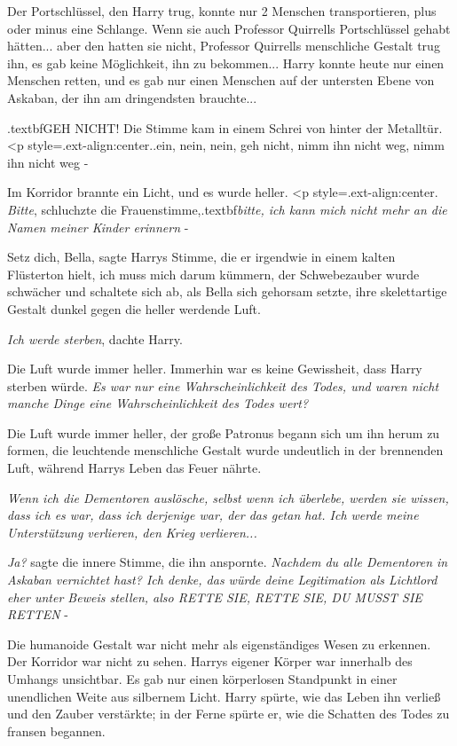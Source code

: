 Der Portschlüssel, den Harry trug, konnte nur 2 Menschen transportieren, plus
oder minus eine Schlange. Wenn sie auch Professor Quirrells Portschlüssel gehabt
hätten... aber den hatten sie nicht, Professor Quirrells menschliche Gestalt
trug ihn, es gab keine Möglichkeit, ihn zu bekommen... Harry konnte heute nur
einen Menschen retten, und es gab nur einen Menschen auf der untersten Ebene von
Askaban, der ihn am dringendsten brauchte...

\grqq{}.textbf{GEH NICHT!}\grqq{} Die
Stimme kam in einem Schrei von hinter der Metalltür.   <p
style=\grqq{}.ext-align:center\grqq{}.\grqq{}.ein, nein, nein, geh nicht, nimm
ihn nicht weg, nimm ihn nicht weg -\grqq{}

Im Korridor brannte ein Licht, und es wurde heller. <p
style=\grqq{}.ext-align:center\grqq{}. \glqq{}\emph{Bitte}\grqq{}, schluchzte die
Frauenstimme,\grqq{}.textbf{\emph{bitte, ich kann mich nicht mehr an die Namen
meiner Kinder erinnern} }-\grqq{}

\glqq{}Setz dich, Bella\grqq{}, sagte Harrys Stimme, die er irgendwie in einem
kalten Flüsterton hielt, \glqq{}ich muss mich darum kümmern\grqq{}, der
Schwebezauber wurde schwächer und schaltete sich ab, als Bella sich gehorsam
setzte, ihre skelettartige Gestalt dunkel gegen die heller werdende Luft.

\emph{Ich werde sterben}, dachte Harry.

Die Luft wurde immer heller. Immerhin war es keine Gewissheit, dass Harry
sterben würde. \emph{Es war nur eine Wahrscheinlichkeit des Todes, und waren
nicht manche Dinge eine Wahrscheinlichkeit des Todes wert?}

Die Luft wurde immer heller, der große Patronus begann sich um ihn herum zu
formen, die leuchtende menschliche Gestalt wurde undeutlich in der brennenden
Luft, während Harrys Leben das Feuer nährte.

\emph{Wenn ich die Dementoren auslösche, selbst wenn ich überlebe, werden sie
wissen, dass ich es war, dass ich derjenige war, der das getan hat. Ich werde
meine Unterstützung verlieren, den Krieg verlieren...}

\emph{Ja?} sagte die innere Stimme, die ihn anspornte. \emph{Nachdem du alle
Dementoren in Askaban vernichtet hast? Ich denke, das würde deine Legitimation
als Lichtlord eher unter Beweis stellen, also RETTE SIE, RETTE SIE, DU MUSST SIE
RETTEN} -

Die humanoide Gestalt war nicht mehr als eigenständiges Wesen zu erkennen. Der
Korridor war nicht zu sehen. Harrys eigener Körper war innerhalb des Umhangs
unsichtbar. Es gab nur einen körperlosen Standpunkt in einer unendlichen Weite
aus silbernem Licht. Harry spürte, wie das Leben ihn verließ und den Zauber
verstärkte; in der Ferne spürte er, wie die Schatten des Todes zu fransen
begannen.

